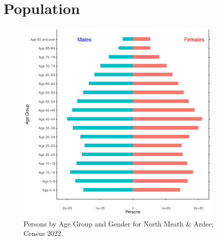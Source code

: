\documentclass{article}
\begin{document}
\pagebreak

\section{Population} 
\label{sect:Pop}

\begin{figure}[h]
	\centering
	\includegraphics[width = 100mm]{../figures/PyramidPlot.pdf}
	\caption{Persons by Age Group and Gender for North Meath & Ardee; Census 2022.}
	\label{fig:2ae19629-1a6a-13a3-e055-000000000001}
	\end{figure}
\end{document}
